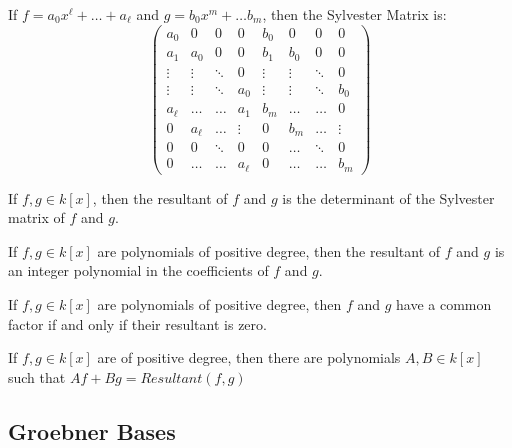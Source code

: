                 \begin{definition}
                If $f = a_0 x^{\ell} +\hdots + a_{\ell}$ and $g = b_0 x^m + \hdots b_m$, then the Sylvester Matrix is:
                \begin{equation*}
                    \begin{pmatrix} a_0 & 0 & 0 & 0 & b_0 & 0 & 0 & 0 \\ a_1 & a_0 & 0 & 0 & b_1 & b_0 & 0 & 0 \\ \vdots & \vdots & \ddots & 0 & \vdots & \vdots & \ddots & 0 \\\vdots & \vdots & \ddots & a_{0} & \vdots & \vdots & \ddots & b_0 \\ a_{\ell} & \hdots & \hdots & a_{1} & b_{m} & \hdots & \hdots & 0 \\ 0 & a_{\ell} & \hdots& \vdots & 0 & b_{m} & \hdots & \vdots\\ 0 & 0 & \ddots & 0 & 0 & \hdots & \ddots & 0 \\ 0 & \hdots & \hdots & a_{\ell} & 0 & \hdots & \hdots & b_{m}\end{pmatrix}
                \end{equation*}
                \end{definition}
                \begin{theorem}
                If $f,g \in k[x]$, then the resultant of $f$ and $g$ is the determinant of the Sylvester matrix of $f$ and $g$.
                \end{theorem}
                \begin{theorem}
                If $f,g\in k[x]$ are polynomials of positive degree, then the resultant of $f$ and $g$ is an integer polynomial in the coefficients of $f$ and $g$.
                \end{theorem}
                \begin{theorem}
                If $f,g\in k[x]$ are polynomials of positive degree, then $f$ and $g$ have a common factor if and only if their resultant is zero.
                \end{theorem}
                \begin{theorem}
                If $f,g\in k[x]$ are of positive degree, then there are polynomials $A,B \in k[x]$ such that $Af + Bg = Resultant(f,g)$
                \end{theorem}
        \subsection{Groebner Bases}

